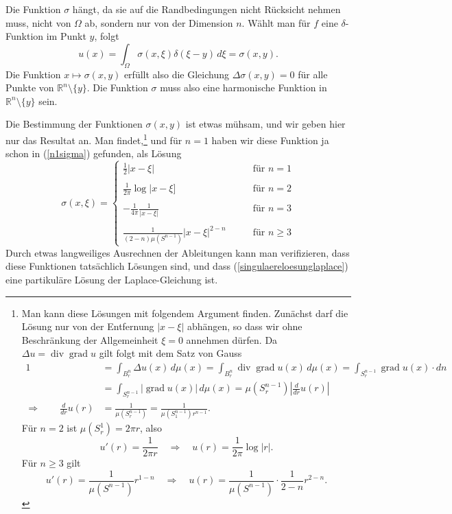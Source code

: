 Die Funktion $\sigma$ hängt, da sie auf die Randbedingungen nicht 
Rücksicht nehmen muss, nicht von $\Omega$ ab, sondern nur von der
Dimension $n$.
Wählt man für $f$ eine $\delta$-Funktion im Punkt $y$, folgt
\[
u(x)
=
\int_\Omega \sigma(x,\xi)\delta(\xi - y)\,d\xi
=
\sigma(x,y).
\]
Die Funktion $x\mapsto \sigma(x,y)$ erfüllt also die Gleichung
$\Delta \sigma(x,y)=0$ für alle Punkte von ${\mathbb R}^n\setminus\{y\}$.
Die Funktion $\sigma$ muss also eine harmonische Funktion in 
$\mathbb R^n\setminus\{y\}$ sein.

Die Bestimmung der Funktionen $\sigma(x,y)$ ist etwas mühsam, und wir
geben hier nur das Resultat an.
Man findet,\footnote{Man kann
diese Lösungen mit folgendem Argument finden. Zunächst darf die Lösung
nur von der Entfernung $|x-\xi|$ abhängen, so dass wir ohne
Beschränkung der Allgemeinheit $\xi=0$ annehmen dürfen.
Da $\Delta u=\operatorname{div}\operatorname{grad}u$ gilt folgt mit
dem Satz von Gauss
\begin{align*}
1&=\int_{B_r^n} \Delta u(x)\,d\mu(x)
=
\int_{B_r^n} \operatorname{div}\operatorname{grad} u(x)\,d\mu(x)
=\int_{S_r^{n-1}}\operatorname{grad}u(x)\cdot dn
\\
&=\int_{S_r^{n-1}}|\operatorname{grad}u(x)|\,d\mu(x)
=\mu(S_r^{n-1})\left|\frac{d}{dr}u(r)\right|
\\
\Rightarrow\qquad\frac{d}{dr}u(r)
&=\frac1{\mu(S_r^{n-1})}
=\frac1{\mu(S_1^{n-1})r^{n-1}}.
\end{align*}
Für $n=2$ ist $\mu(S_r^1)=2\pi r$, also
\[
u'(r)=\frac1{2\pi r}\quad\Rightarrow\quad u(r)=\frac1{2\pi}\log|r|.
\]
Für $n\ge 3$ gilt
\[
u'(r)=\frac1{\mu(S^{n-1})}r^{1-n}\quad\Rightarrow\quad u(r)=\frac1{\mu(S^{n-1})}\cdot \frac1{2-n}r^{2-n}.
\]
} und für $n=1$ haben wir diese Funktion ja schon in (\ref{n1sigma})
gefunden,
als Lösung
\begin{equation}
\sigma(x,\xi)=
\begin{cases}
\displaystyle \frac12|x-\xi|
&\qquad \text{für $n=1$}
\\
\\
\displaystyle \frac1{2\pi}\log|x-\xi]
&\qquad \text{für $n=2$}
\\
\\
\displaystyle -\frac1{4\pi}\frac1{|x-\xi|}
&\qquad \text{für $n= 3$}
\\
\\
\displaystyle \frac1{(2-n)\mu(S^{n-1})}|x-\xi|^{2-n}
&\qquad \text{für $n\ge 3$}
\end{cases}
\end{equation}
Durch etwas langweiliges Ausrechnen der Ableitungen kann man verifizieren,
dass diese Funktionen tatsächlich Lösungen sind, und dass
(\ref{singulaereloesunglaplace}) eine partikuläre Lösung der
Laplace-Gleichung ist.

